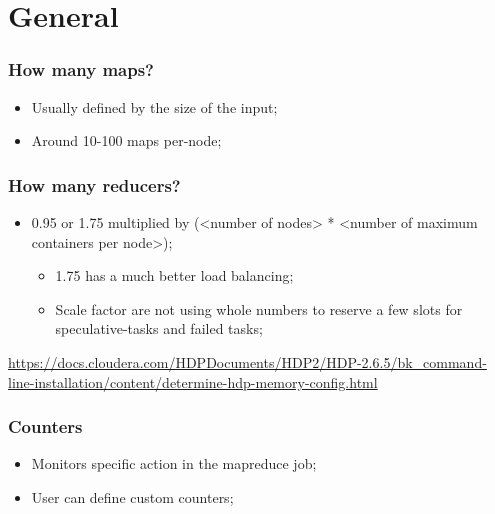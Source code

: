 \documentclass[aspectratio=169]{beamer}
\begin{document}
\section{General}

\begin{frame}
	\frametitle{How many maps?}

	\begin{itemize}
		\item Usually defined by the size of the input;
		\item Around 10-100 maps per-node;
	\end{itemize}
\end{frame}

\begin{frame}
	\frametitle{How many reducers?}

	\begin{itemize}
		\item 0.95 or 1.75 multiplied by (<number of nodes> * <number of maximum containers per node>);
		      \begin{itemize}
			      \item 1.75 has a much better load balancing;
			      \item Scale factor are not using whole numbers to reserve a few slots for speculative-tasks and failed tasks;
		      \end{itemize}
	\end{itemize}

	\begin{center}
		{\tiny \href{https://docs.cloudera.com/HDPDocuments/HDP2/HDP-2.6.5/bk_command-line-installation/content/determine-hdp-memory-config.html}{https://docs.cloudera.com/HDPDocuments/HDP2/HDP-2.6.5/bk\_command-line-installation/content/determine-hdp-memory-config.html}}
	\end{center}
\end{frame}

\begin{frame}
	\frametitle{Counters}

	\begin{itemize}
	    \item Monitors specific action in the mapreduce job;
		\item User can define custom counters;
	\end{itemize}
\end{frame}
\end{document}
